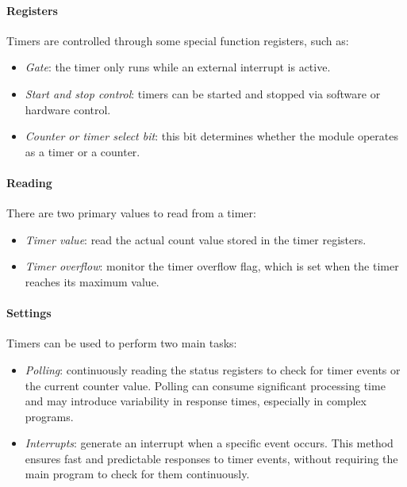 \paragraph*{Registers}
Timers are controlled through some special function registers, such as: 
\begin{itemize}
    \item \textit{Gate}: the timer only runs while an external interrupt is active. 
    \item \textit{Start and stop control}: timers can be started and stopped via software or hardware control. 
    \item \textit{Counter or timer select bit}: this bit determines whether the module operates as a timer or a counter. 
\end{itemize}

\paragraph*{Reading}
There are two primary values to read from a timer:
\begin{itemize}
    \item \textit{Timer value}: read the actual count value stored in the timer registers. 
    \item \textit{Timer overflow}: monitor the timer overflow flag, which is set when the timer reaches its maximum value. 
\end{itemize}

\paragraph*{Settings}
Timers can be used to perform two main tasks: 
\begin{itemize}
    \item \textit{Polling}: continuously reading the status registers to check for timer events or the current counter value. 
        Polling can consume significant processing time and may introduce variability in response times, especially in complex programs.
    \item \textit{Interrupts}: generate an interrupt when a specific event occurs. 
        This method ensures fast and predictable responses to timer events, without requiring the main program to check for them continuously.
\end{itemize}

